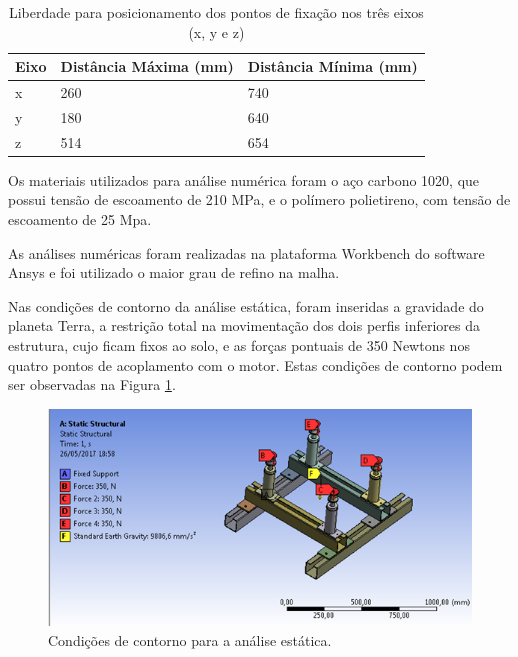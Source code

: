 \begin{table}[!h]
\centering
\caption{Liberdade para posicionamento dos pontos de fixação nos três eixos (x, y e z)}
\label{tab:pontosfixacao}
\begin{tabular}{|l|l|l|}
\hline
\multicolumn{1}{|c|}{\textbf{Eixo}}    & \multicolumn{1}{c|}{\textbf{Distância Máxima (mm)}} & \multicolumn{1}{c|}{\textbf{Distância Mínima (mm)}} \\ \hline
x        					   & 260                             & 740                \\ \hline
y       					   & 180                              & 640               \\ \hline
z             				   & 514                              & 654            \\ \hline
\end{tabular}
\end{table}


\pagebreak

Os materiais utilizados para análise numérica foram o aço carbono 1020, que possui tensão de escoamento de 210 MPa, e o polímero polietireno, com tensão de escoamento de 25 Mpa.

As análises numéricas foram realizadas na plataforma Workbench do software Ansys e foi utilizado o maior grau de refino na malha.

Nas condições de contorno da análise estática, foram inseridas a gravidade do planeta Terra, a restrição total na movimentação dos dois perfis inferiores da estrutura, cujo ficam fixos ao solo, e as forças pontuais de 350 Newtons nos quatro pontos de acoplamento com o motor. Estas condições de contorno podem ser observadas na Figura \ref{fig:analiseestatica}.

\begin{figure}[h!]
	\centering
	\includegraphics[keepaspectratio=true,scale= 0.8]{figuras/analise-estatica.png}
	\caption{Condições de contorno para a análise estática.}
	\label{fig:analiseestatica}
\end{figure}

